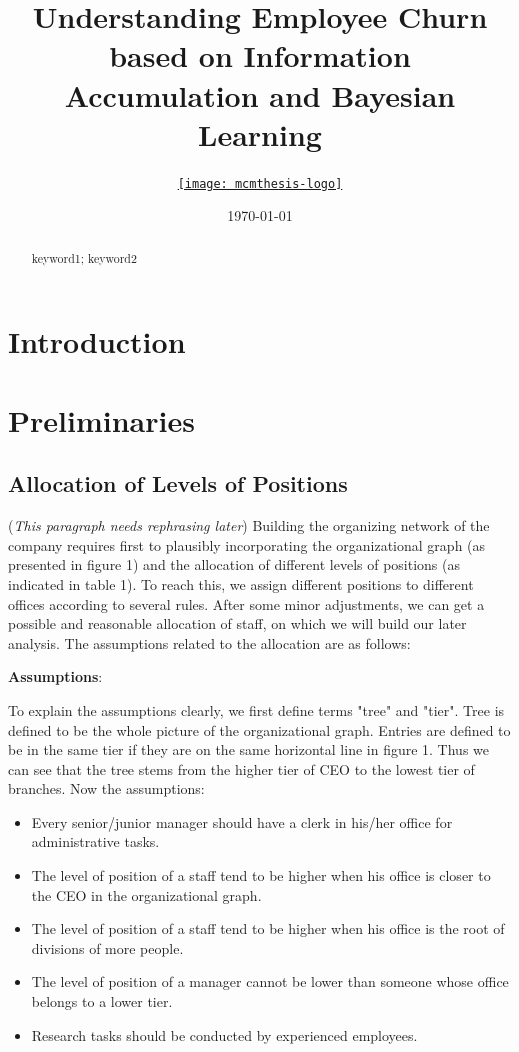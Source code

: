 \documentclass[tcn = 37075, sheet = true, abstract = true]{mcmthesis}
\title{Understanding Employee Churn based on Information Accumulation and Bayesian Learning}
\author{\small \href{http://www.latexstudio.net/}
  {\texttt{[image: mcmthesis-logo]}}}
\date{\today}
\begin{document}
\begin{abstract}
\lipsum[1]
\begin{keywords}
keyword1; keyword2
\end{keywords}
\end{abstract}
\maketitle
\newpage


\tableofcontents
\newpage
\section{Introduction}

\section{Preliminaries}

\subsection{Allocation of Levels of Positions}

(\textit{This paragraph needs rephrasing later}) Building the organizing network of the company requires first to plausibly incorporating the organizational graph (as presented in figure 1) and the allocation of different levels of positions (as indicated in table 1). To reach this, we assign different positions to different offices according to several rules. After some minor adjustments, we can get a possible and reasonable allocation of staff, on which we will build our later analysis. The assumptions related to the allocation are as follows:

\noindent \textbf{Assumptions}:

To explain the assumptions clearly, we first define terms "tree" and "tier". Tree is defined to be the whole picture of the organizational graph. Entries are defined to be in the same tier if they are on the same horizontal line in figure 1. Thus we can see that the tree stems from the higher tier of CEO to the lowest tier of branches. Now the assumptions:

\begin{itemize}
\item Every senior/junior manager should have a clerk in his/her office for administrative tasks.
\item The level of position of a staff tend to be higher when his office is closer to the CEO in the organizational graph.
\item The level of position of a staff tend to be higher when his office is the root of divisions of more people.
\item The level of position of a manager cannot be lower than someone whose office belongs to a lower tier.
\item Research tasks should be conducted by experienced employees.
\end{itemize}
\end{document}
